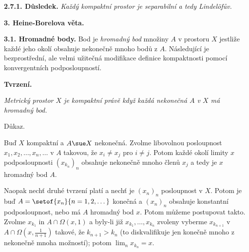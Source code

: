 \documentclass[12pt]{article}
\begin{document}
{\bf 2.7.1. Důsledek.} {\em Každý kompaktní prostor je separabilní a tedy Lindel\"ofův.}
\bigskip



\vskip10mm
 
 {\large\bf 3. Heine-Borelova věta.}
 
 \bigskip
 
 {\bf 3.1. Hromadné body.} Bod je {\em hromadný bod} množiny $A$ v prostoru $X$ jestliže každé jeho okolí obsahuje nekonečně mnoho bodů z $A$. Následující je bezprostřední, ale velmi užitečná modifikace definice kompaktnosti pomocí konvergentních podposloupností.
 
 \medskip
 
 {\bf Tvrzení.} {\em Metrický prostor $X$ je kompaktní právě když  každá nekonečná $A$ v $X$ má hromadný bod.
 
 Důkaz.} Buď $X$ kompaktní a $A\sue X$ nekonečná. Zvolme libovolnou posloupnost $x_1,x_2,\dots,x_n,\dots$  v  $A$ takovou, že $x_i\neq x_j$ pro $i\neq j$. Potom každé okolí limity $x$ podposloupnosti $(x_{k_n})_n$ obsahuje nekone\v cně mnoho členů $x_j$ a tedy je $x$ hromadný bod $A$.
 
 Naopak nechť druhé tvrzení platí a nechť je $(x_n)_n$ posloupnost v $X$. Potom je buď $A=\setof{x_n}{n=1,2,\dots}$ konečná
 a $(x_n)_n$ obsahuje konstantní podposloupnost,  nebo má $A$ hromadný bod $x$. Potom můžeme postupovat takto. Zvolme $x_{k_1}$ in $A\cap \Omega(x,1)$ a byly-li již $x_{k_1},\dots,x_{k_n}$ zvoleny vyberme $x_{k_{n+1}}$ v $A\cap\Omega(x,\frac1{n+1})$ takové, že $k_{n+1}>k_n$ (to diskvalifikuje jen konečně mnoho z nekonečně mnoha možností); potom $\lim_nx_{k_n}=x$. \sq
 
 \bigskip
 
\end{document}
